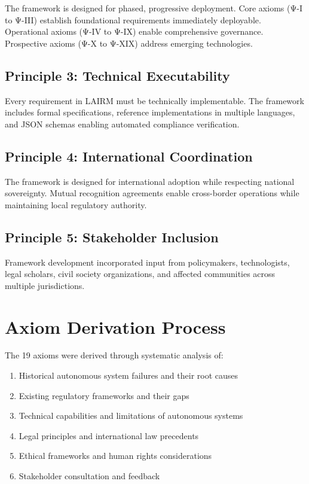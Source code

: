 \documentclass[12pt,a4paper,twoside,openright]{book}
\begin{document}
The framework is designed for phased, progressive deployment. Core axioms (Ψ-I to Ψ-III) establish foundational requirements immediately deployable. Operational axioms (Ψ-IV to Ψ-IX) enable comprehensive governance. Prospective axioms (Ψ-X to Ψ-XIX) address emerging technologies.

\subsection{Principle 3: Technical Executability}

Every requirement in LAIRM must be technically implementable. The framework includes formal specifications, reference implementations in multiple languages, and JSON schemas enabling automated compliance verification.

\subsection{Principle 4: International Coordination}

The framework is designed for international adoption while respecting national sovereignty. Mutual recognition agreements enable cross-border operations while maintaining local regulatory authority.

\subsection{Principle 5: Stakeholder Inclusion}

Framework development incorporated input from policymakers, technologists, legal scholars, civil society organizations, and affected communities across multiple jurisdictions.

\section{Axiom Derivation Process}

The 19 axioms were derived through systematic analysis of:

\begin{enumerate}
    \item Historical autonomous system failures and their root causes
    \item Existing regulatory frameworks and their gaps
    \item Technical capabilities and limitations of autonomous systems
    \item Legal principles and international law precedents
    \item Ethical frameworks and human rights considerations
    \item Stakeholder consultation and feedback
\end{enumerate}
\end{document}

